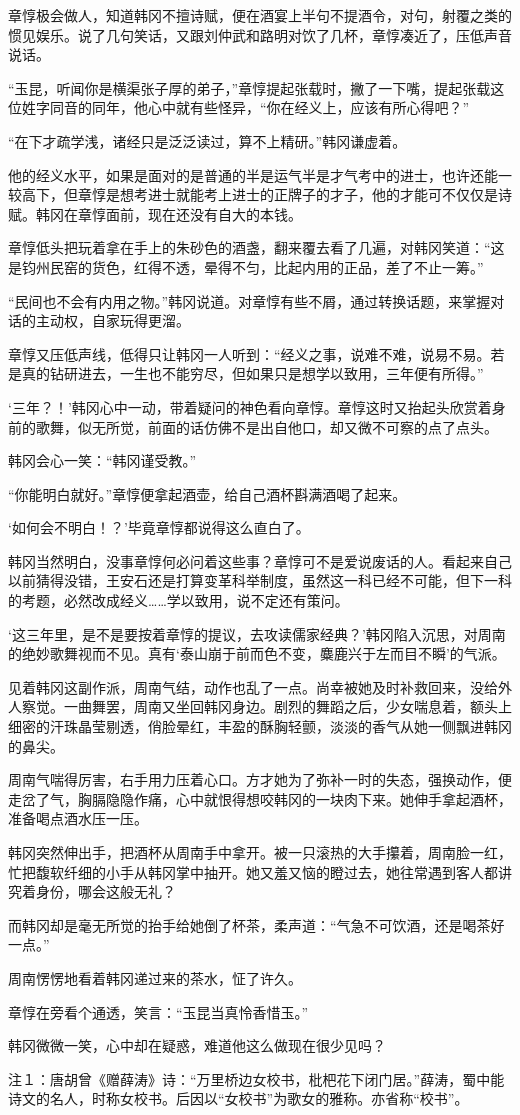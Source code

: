章惇极会做人，知道韩冈不擅诗赋，便在酒宴上半句不提酒令，对句，射覆之类的惯见娱乐。说了几句笑话，又跟刘仲武和路明对饮了几杯，章惇凑近了，压低声音说话。

“玉昆，听闻你是横渠张子厚的弟子，”章惇提起张载时，撇了一下嘴，提起张载这位姓字同音的同年，他心中就有些怪异，“你在经义上，应该有所心得吧？”

“在下才疏学浅，诸经只是泛泛读过，算不上精研。”韩冈谦虚着。

他的经义水平，如果是面对的是普通的半是运气半是才气考中的进士，也许还能一较高下，但章惇是想考进士就能考上进士的正牌子的才子，他的才能可不仅仅是诗赋。韩冈在章惇面前，现在还没有自大的本钱。

章惇低头把玩着拿在手上的朱砂色的酒盏，翻来覆去看了几遍，对韩冈笑道：“这是钧州民窑的货色，红得不透，晕得不匀，比起内用的正品，差了不止一筹。”

“民间也不会有内用之物。”韩冈说道。对章惇有些不屑，通过转换话题，来掌握对话的主动权，自家玩得更溜。

章惇又压低声线，低得只让韩冈一人听到：“经义之事，说难不难，说易不易。若是真的钻研进去，一生也不能穷尽，但如果只是想学以致用，三年便有所得。”

‘三年？！’韩冈心中一动，带着疑问的神色看向章惇。章惇这时又抬起头欣赏着身前的歌舞，似无所觉，前面的话仿佛不是出自他口，却又微不可察的点了点头。

韩冈会心一笑：“韩冈谨受教。”

“你能明白就好。”章惇便拿起酒壶，给自己酒杯斟满酒喝了起来。

‘如何会不明白！？’毕竟章惇都说得这么直白了。

韩冈当然明白，没事章惇何必问着这些事？章惇可不是爱说废话的人。看起来自己以前猜得没错，王安石还是打算变革科举制度，虽然这一科已经不可能，但下一科的考题，必然改成经义……学以致用，说不定还有策问。

‘这三年里，是不是要按着章惇的提议，去攻读儒家经典？’韩冈陷入沉思，对周南的绝妙歌舞视而不见。真有‘泰山崩于前而色不变，麋鹿兴于左而目不瞬’的气派。

见着韩冈这副作派，周南气结，动作也乱了一点。尚幸被她及时补救回来，没给外人察觉。一曲舞罢，周南又坐回韩冈身边。剧烈的舞蹈之后，少女喘息着，额头上细密的汗珠晶莹剔透，俏脸晕红，丰盈的酥胸轻颤，淡淡的香气从她一侧飘进韩冈的鼻尖。

周南气喘得厉害，右手用力压着心口。方才她为了弥补一时的失态，强换动作，便走岔了气，胸膈隐隐作痛，心中就恨得想咬韩冈的一块肉下来。她伸手拿起酒杯，准备喝点酒水压一压。

韩冈突然伸出手，把酒杯从周南手中拿开。被一只滚热的大手攥着，周南脸一红，忙把馥软纤细的小手从韩冈掌中抽开。她又羞又恼的瞪过去，她往常遇到客人都讲究着身份，哪会这般无礼？

而韩冈却是毫无所觉的抬手给她倒了杯茶，柔声道：“气急不可饮酒，还是喝茶好一点。”

周南愣愣地看着韩冈递过来的茶水，怔了许久。

章惇在旁看个通透，笑言：“玉昆当真怜香惜玉。”

韩冈微微一笑，心中却在疑惑，难道他这么做现在很少见吗？

注１：唐胡曾《赠薛涛》诗：“万里桥边女校书，枇杷花下闭门居。”薛涛，蜀中能诗文的名人，时称女校书。后因以“女校书”为歌女的雅称。亦省称“校书”。

